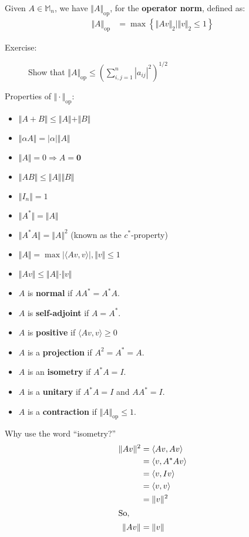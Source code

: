 \documentclass[8pt]{extarticle}
\begin{document}
  Given $A\in \mathbb{M}_n$, we have $\Vert A \Vert_{\text{op}}$, for the \textbf{operator norm}, defined as:
  \begin{align*}
    \Vert A \Vert_{\text{op}} &= \max\left\{\Vert Av\Vert_{2}\mid \Vert v\Vert_2 \leq 1\right\}
  \end{align*}
  \begin{description}
    \item[Exercise:] Show that $\Vert A\Vert_{\text{op}} \leq \left(\sum_{i,j=1}^{n}|a_{ij}|^2\right)^{1/2}$
  \end{description}
  Properties of $\Vert \cdot \Vert_{\text{op}}$:
  \begin{itemize}
    \item $\Vert A + B \Vert \leq \Vert A \Vert + \Vert B \Vert$
    \item $\Vert \alpha A \Vert = |\alpha| \Vert A \Vert$
    \item $\Vert A \Vert = 0 \Rightarrow A = \mathbf{0}$
    \item $\Vert AB\Vert \leq \Vert A \Vert \Vert B \Vert$
    \item $\Vert I_n\Vert = 1$
    \item $\Vert A^* \Vert = \Vert A \Vert$
    \item $\Vert A^* A\Vert = \Vert A \Vert^2$ (known as the $c^*$-property)
    \item $\Vert A \Vert = \max |\langle Av,v\rangle|, \Vert v \Vert \leq 1$
    \item $\Vert Av\Vert \leq \Vert A \Vert \cdot \Vert v \Vert$
  \end{itemize}
  \begin{itemize}
    \item $A$ is \textbf{normal} if $A A^* = A^* A$.
    \item $A$ is \textbf{self-adjoint} if $A = A^*$.
    \item $A$ is \textbf{positive} if $\langle Av,v\rangle \geq 0$
    \item $A$ is a \textbf{projection} if $A^2 = A^* = A$.
    \item $A$ is an \textbf{isometry} if $A^* A = I$.
    \item $A$ is a \textbf{unitary} if $A^* A = I$ and $AA^* = I$.
    \item $A$ is a \textbf{contraction} if $\Vert A \Vert_{\text{op}} \leq 1$.
  \end{itemize}
  Why use the word ``isometry?''
  \begin{align*}
    \Vert Av \Vert^2 &= \langle Av, Av\rangle\\
                     &= \langle v,A^*A v \rangle\\
                     &= \langle v,Iv\rangle\\
                     &= \langle v, v\rangle\\
                     &= \Vert v \Vert^2\\
                     \shortintertext{So,}
    \Vert Av\Vert &= \Vert v \Vert
  \end{align*}
\end{document}
